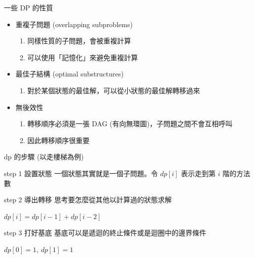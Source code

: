 \documentclass[aspectratio=169]{beamer}
\begin{document}
    \begin{frame}{一些 DP 的性質}
        \begin{itemize}
            \item 重複子問題 (overlapping subproblems)
            \begin{enumerate}
                \item 同樣性質的子問題，會被重複計算
                \item 可以使用「記憶化」來避免重複計算
            \end{enumerate}
            \item 最佳子結構 (optimal substructures)
            \begin{enumerate}
                \item 對於某個狀態的最佳解，可以從小狀態的最佳解轉移過來
            \end{enumerate}
            \item 無後效性
            \begin{enumerate}
                \item 轉移順序必須是一張 DAG (有向無環圖)，子問題之間不會互相呼叫
                \item 因此轉移順序很重要
            \end{enumerate}
        \end{itemize}
    \end{frame}

    \begin{frame}{dp 的步驟 (以走樓梯為例)}
        \begin{alertblock}{step 1 設置狀態}
            一個狀態其實就是一個子問題。令 $dp[i]$ 表示走到第 $i$ 階的方法數
        \end{alertblock}
        
        \begin{block}{step 2 導出轉移}
            思考要怎麼從其他以計算過的狀態求解  \\
            \begin{center}
                $dp[i] = dp[i-1] + dp[i-2]$
            \end{center}
        \end{block}
        
        \begin{block}{step 3 打好基底}
            基底可以是遞迴的終止條件或是迴圈中的邊界條件 \\
            \begin{center}
                $dp[0] = 1, \ dp[1] = 1$   
            \end{center}
        \end{block}
    \end{frame}
\end{document}
